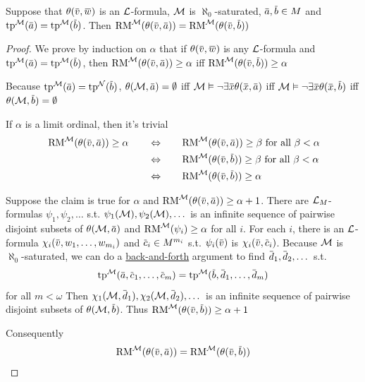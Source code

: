 \documentclass[11pt]{article}
\begin{document}
\begin{lemma}[]
\label{lemma6.2.2}
Suppose that \(\theta(\barv,\barw)\) is an \(\mathcal{L}\)-formula, \(\mathcal{M}\)
is \(\aleph_0\)-saturated, \(\bara,\barb\in M\) and \(\tp^{\calm}(\bara)=\tp^{\calm}(\barb)\).
Then \(\RM^{\calm}(\theta(\barv,\bara))=\RM^{\calm}(\theta(\barv,\barb))\)
\end{lemma}

\begin{proof}
We prove by induction on \(\alpha\) that if \(\theta(\barv,\barw)\) is any \(\mathcal{L}\)-formula
and \(\tp^{\calm}(\bara)=\tp^{\calm}(\barb)\), then \(\RM^{\calm}(\theta(\barv,\bara))\ge\alpha\)
iff \(\RM^{\calm}(\theta(\barv,\barb))\ge\alpha\)

Because \(\tp^{\calm}(\bara)=\tp^{\caln}(\barb)\), \(\theta(\calm,\bara)=\emptyset\) iff \(\calm\vDash\neg\exists\barx\theta(\barx,\bara)\)
iff \(\calm\vDash\neg\exists\barx\theta(\barx,\barb)\) iff \(\theta(\calm,\barb)=\emptyset\)

If \(\alpha\) is a limit ordinal, then it's trivial
\begin{alignat*}{3}
&\RM^{\calm}(\theta(\barv,\bara))\ge\alpha\quad&&\Leftrightarrow\quad&&\RM^{\calm}(\theta(\barv,\bara))\ge\beta\text{ for all }\beta<\alpha\\
&&&\Leftrightarrow&&\RM^{\calm}(\theta(\barv,\barb))\ge\beta\text{ for all }\beta<\alpha\\
&&&\Leftrightarrow&&\RM^{\calm}(\theta(\barv,\barb))\ge\alpha
\end{alignat*}

Suppose the claim is true for \(\alpha\) and \(\RM^{\calm}(\theta(\barv,\bara))\ge\alpha+1\). There
are \(\mathcal{L}_M\)-formulas \(\psi_1,\psi_2,\dots\) s.t. \(\psi_1(\mathcal{M}),\psi_2(\mathcal{M}),\dots\) is an infinite sequence of pairwise
disjoint subsets of \(\theta(\calm,\bara)\) and \(\operatorname{RM}^{\mathcal{M}}(\psi_i)\ge\alpha\) for all \(i\). For each \(i\), there is
an \(\mathcal{L}\)-formula \(\chi_i(\barv,w_1,\dots,w_{m_i})\) and \(\barc_i\in M^{m_i}\) s.t. \(\psi_i(\barv)\)
is \(\chi_i(\barv,\barc_i)\). Because \(\mathcal{M}\) is \(\aleph_0\)-saturated, we can do a \uline{back-and-forth}
\label{Problem10}
argument to find \(\bard_1,\bard_2,\dots\) s.t.
\begin{equation*}
\tp^{\calm}(\bara,\barc_1,\dots,\barc_m)=\tp^{\calm}(\barb,\bard_1,\dots,\bard_m)
\end{equation*}
for all \(m<\omega\)
Then \(\chi_1(\calm,\bard_1),\chi_2(\calm,\bard_2),\dots\) is an infinite sequence of pairwise disjoint subsets
of \(\theta(\calm,\barb)\). Thus \(\RM^{\calm}(\theta(\barv,\barb))\ge\alpha+1\)

Consequently
\begin{equation*}
\RM^{\calm}(\theta(\barv,\bara))=\RM^{\calm}(\theta(\barv,\barb))
\end{equation*}
\end{proof}
\end{document}
